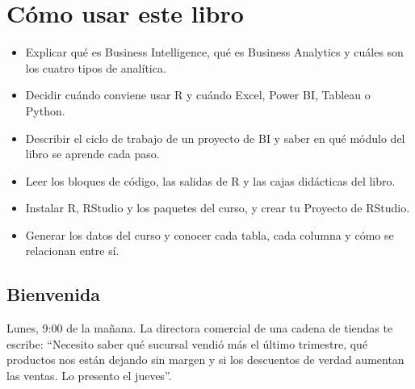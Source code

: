 \chapter{Cómo usar este libro}
\label{cap:introduccion}

\begingroup
\renewcommand{\thesection}{\arabic{section}}
\renewcommand{\thefigure}{\arabic{figure}}
\renewcommand{\thetable}{\arabic{table}}

\begin{objetivos}[title={\ding{43}\ \ Al terminar esta introducción podrás\ldots}]
\begin{itemize}
  \item Explicar qué es Business Intelligence, qué es Business Analytics y
        cuáles son los cuatro tipos de analítica.
  \item Decidir cuándo conviene usar R y cuándo Excel, Power BI, Tableau o
        Python.
  \item Describir el ciclo de trabajo de un proyecto de BI y saber en qué
        módulo del libro se aprende cada paso.
  \item Leer los bloques de código, las salidas de R y las cajas didácticas
        del libro.
  \item Instalar R, RStudio y los paquetes del curso, y crear tu Proyecto de
        RStudio.
  \item Generar los datos del curso y conocer cada tabla, cada columna y
        cómo se relacionan entre sí.
\end{itemize}
\end{objetivos}

\section{Bienvenida}
\label{sec:m0-bienvenida}

Lunes, 9:00 de la mañana. La directora comercial de una cadena de tiendas te
escribe: ``Necesito saber qué sucursal vendió más el último trimestre, qué
productos nos están dejando sin margen y si los descuentos de verdad aumentan
las ventas. Lo presento el jueves''.

